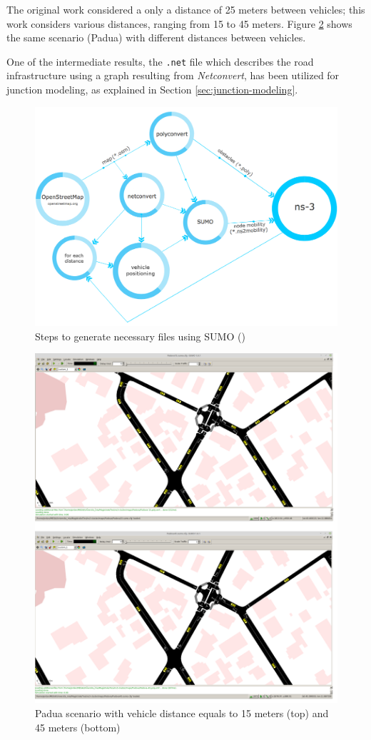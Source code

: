 		The original work considered a only a distance of 25 meters between vehicles; this work considers various distances, ranging from 15 to 45 meters. Figure \ref{fig:sumo-distances}  shows the same scenario (Padua) with different distances between vehicles.
		
		
		One of the intermediate results, the \texttt{.net} file which describes the road infrastructure using a graph resulting from \textit{Netconvert}, has been utilized for junction modeling, as explained in Section \ref{sec:junction-modeling}.
		\begin{figure}[H]
			\centering
			\includegraphics[width=\textwidth]{immagini/sumo-process}
			\caption{Steps to generate necessary files using SUMO (\cite{ROM2017})}
			\label{fig:sumo-process}
		\end{figure}
		
		\begin{figure}[H]
			\centering
			\includegraphics[width=\textwidth]{immagini/sumo-distances}
			\caption{Padua scenario with vehicle distance equals to 15 meters (top) and 45 meters (bottom)}
			\label{fig:sumo-distances}
		\end{figure}
